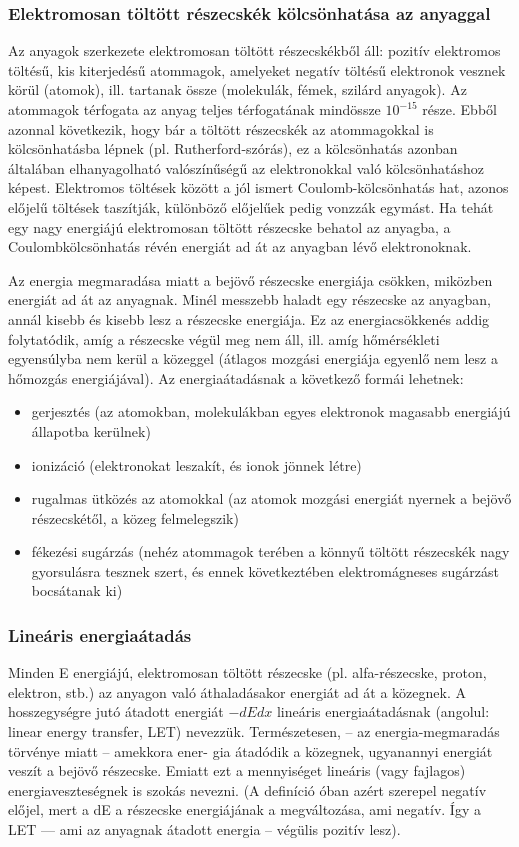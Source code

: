 \documentclass[../main.tex]{subfiles}
\begin{document}
\subsubsection{Elektromosan töltött részecskék kölcsönhatása az anyaggal}
Az anyagok szerkezete elektromosan töltött részecskékből áll: pozitív elektromos töltésű,
kis kiterjedésű atommagok, amelyeket negatív töltésű elektronok vesznek körül (atomok),
ill. tartanak össze (molekulák, fémek, szilárd anyagok). Az atommagok térfogata az
anyag teljes térfogatának mindössze $10^{-15}$ része. Ebből azonnal következik, hogy bár a
töltött részecskék az atommagokkal is kölcsönhatásba lépnek (pl. Rutherford-szórás),
ez a kölcsönhatás azonban általában elhanyagolható valószínűségű az elektronokkal való
kölcsönhatáshoz képest. Elektromos töltések között a jól ismert Coulomb-kölcsönhatás
hat, azonos előjelű töltések taszítják, különböző előjelűek pedig vonzzák egymást.
Ha tehát egy nagy energiájú elektromosan töltött részecske behatol az anyagba, a Coulombkölcsönhatás révén energiát ad át az anyagban lévő elektronoknak.

Az energia megmaradása miatt a bejövő részecske energiája csökken, miközben energiát ad át az anyagnak.
Minél messzebb haladt egy részecske az anyagban, annál kisebb és kisebb lesz a részecske energiája.
Ez az energiacsökkenés addig folytatódik, amíg a részecske végül meg nem áll, ill. amíg hőmérsékleti egyensúlyba nem kerül a közeggel (átlagos mozgási energiája egyenlő nem lesz a hőmozgás energiájával).
Az energiaátadásnak a következő formái lehetnek:
\begin{itemize}
    \item gerjesztés (az atomokban, molekulákban egyes elektronok magasabb energiájú állapotba kerülnek)
    \item ionizáció (elektronokat leszakít, és ionok jönnek létre)
    \item rugalmas ütközés az atomokkal (az atomok mozgási energiát nyernek a bejövő részecskétől, a közeg felmelegszik)
    \item fékezési sugárzás (nehéz atommagok terében a könnyű töltött részecskék nagy gyorsulásra tesznek szert, és ennek következtében elektromágneses sugárzást bocsátanak ki)
\end{itemize}

\subsubsection{Lineáris energiaátadás}
Minden E energiájú, elektromosan töltött részecske (pl. alfa-részecske, proton, elektron,
stb.) az anyagon való áthaladásakor energiát ad át a közegnek. A hosszegységre jutó
átadott energiát $-dE dx$ lineáris energiaátadásnak (angolul: linear energy transfer, LET)
nevezzük. Természetesen, – az energia-megmaradás törvénye miatt – amekkora ener-
gia átadódik a közegnek, ugyanannyi energiát veszít a bejövő részecske. Emiatt ezt a
mennyiséget lineáris (vagy fajlagos) energiaveszteségnek is szokás nevezni. (A definíció
óban azért szerepel negatív előjel, mert a dE a részecske energiájának a megváltozása,
ami negatív. Így a LET — ami az anyagnak átadott energia – végülis pozitív lesz).
\end{document}
